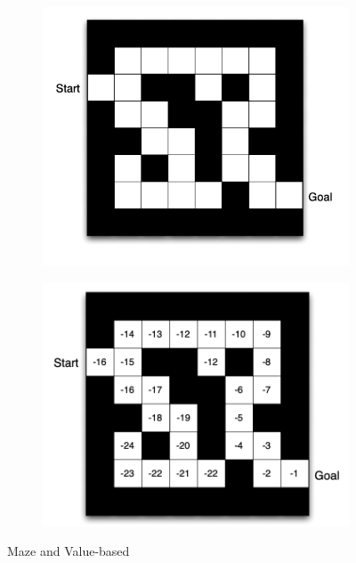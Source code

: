 \documentclass[english]{article}
\begin{document}
\begin{figure}
\centering
\begin{subfigure}{.5\textwidth}
  \centering
  \includegraphics[scale=0.5]{maze.png}
\end{subfigure}%
\begin{subfigure}{.5\textwidth}
  \centering
  \includegraphics[scale=0.5]{value.png}
\end{subfigure}
\caption{Maze and Value-based}
\label{maze}
\end{figure}
\end{document}
